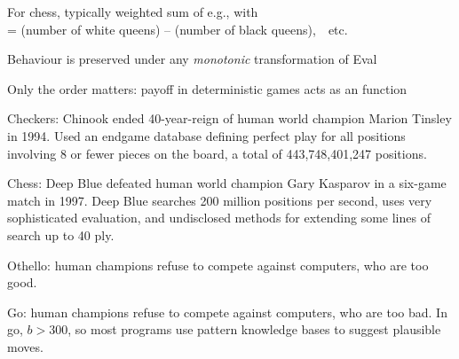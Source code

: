 \documentclass{article}
\begin{document}
\begin{huge}

\vspace*{0.2in}

\textwidth
{}

For chess, typically  weighted sum of 
\mat{\[
{\sc Eval}(s) = w_1 f_1(s) + w_2 f_2(s) + \ldots + w_n f_n(s)
\]}
e.g.,  with \\
 = (number of white queens) -- (number of black queens),\ \ etc.





\vspace*{0.3in}

\textwidth
{}

Behaviour is preserved under any \emph{monotonic} transformation of
{\sc Eval}

Only the order matters:\nl
payoff in deterministic games acts as an  function




Checkers: Chinook ended 40-year-reign of human world champion Marion
Tinsley in 1994. Used an endgame database defining perfect play for
all positions involving 8 or fewer pieces on the board, a total of
443,748,401,247 positions.

Chess: Deep Blue defeated human world champion Gary Kasparov
in a six-game match in 1997. Deep Blue searches 200 million positions
per second, uses very sophisticated evaluation, and undisclosed methods for
extending some lines of search up to 40 ply.

Othello: human champions refuse to compete against computers, who are
too good.

Go: human champions refuse to compete against computers, who are too
bad. In go, $b > 300$, so most programs use pattern knowledge bases to
suggest plausible moves.






\end{huge}
\end{document}
